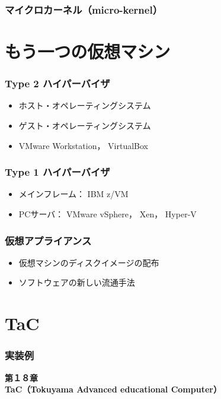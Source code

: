 \documentclass[handout]{beamer}                   %
\begin{document}
\begin{frame}
  \frametitle{マイクロカーネル（micro-kernel）}
\end{frame}

\section{もう一つの仮想マシン}
\begin{frame}
  \frametitle{Type 2 ハイパーバイザ}
  \begin{itemize}
  \item ホスト・オペレーティングシステム
  \item ゲスト・オペレーティングシステム
  \item VMware Workstation， VirtualBox
  \end{itemize}
\end{frame}

\begin{frame}
  \frametitle{Type 1 ハイパーバイザ}
  \begin{itemize}
  \item メインフレーム： IBM z/VM
  \item PCサーバ： VMware vSphere， Xen， Hyper-V
  \end{itemize}
\end{frame}

\begin{frame}
  \frametitle{仮想アプライアンス}
  \begin{itemize}
  \item 仮想マシンのディスクイメージの配布
  \item ソフトウェアの新しい流通手法
  \end{itemize}
\end{frame}

\section{TaC}
\begin{frame}
  \frametitle{実装例}
  \vfill
  \begin{center}
    \textbf{\LARGE 第１８章} \\
    \textbf{\LARGE TaC（Tokuyama Advanced educational Computer）}
  \end{center}
  \vfill
\end{frame}
\end{document}
